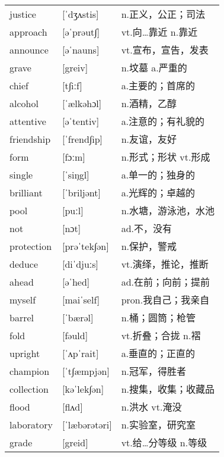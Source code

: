 \documentclass[a4paper]{article}
\begin{document}
\section{}
\begin{tabular}{l l l}

justice & [ˈdʒʌstis] & n.正义，公正；司法 \\
approach & [əˈprəut∫] & vt.向…靠近 n.靠近 \\
announce & [əˈnauns] & vt.宣布，宣告，发表 \\
grave & [greiv] & n.坟墓 a.严重的 \\
chief & [t∫iːf] & a.主要的；首席的 \\
alcohol & [ˈælkəhɔl] & n.酒精，乙醇 \\
attentive & [əˈtentiv] & a.注意的；有礼貌的 \\
friendship & [ˈfrend∫ip] & n.友谊，友好 \\
form & [fɔːm] & n.形式；形状 vt.形成 \\
single & [ˈsiŋgl] & a.单一的；独身的 \\
brilliant & [ˈbriljənt] & a.光辉的；卓越的 \\
pool & [puːl] & n.水塘，游泳池，水池 \\
not & [nɔt] & ad.不，没有 \\
protection & [prəˈtek∫ən] & n.保护，警戒 \\
deduce & [diˈdjuːs] & vt.演绎，推论，推断 \\
ahead & [əˈhed] & ad.在前；向前；提前 \\
myself & [maiˈself] & pron.我自己；我亲自 \\
barrel & [ˈbærəl] & n.桶；圆筒；枪管 \\
fold & [fəuld] & vt.折叠；合拢 n.褶 \\
upright & [ˈʌpˈrait] & a.垂直的；正直的 \\
champion & [ˈt∫æmpjən] & n.冠军，得胜者 \\
collection & [kəˈlek∫ən] & n.搜集，收集；收藏品 \\
flood & [flʌd] & n.洪水 vt.淹没 \\
laboratory & [ˈlæbərətəri] & n.实验室，研究室 \\
grade & [greid] & vt.给…分等级 n.等级 \\

\end{tabular}
\end{document}
